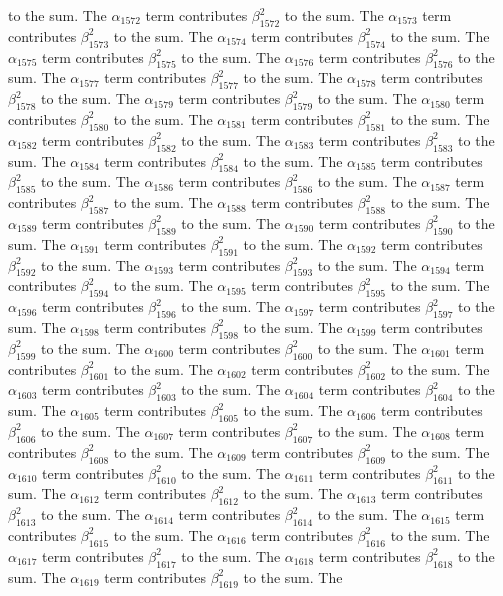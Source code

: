 \begin{lemma}
to the sum. The $\alpha_{1572}$ term contributes $\beta_{1572}^{2}$ to the sum. The $\alpha_{1573}$ term contributes $\beta_{1573}^{2}$ to the sum. The $\alpha_{1574}$ term contributes $\beta_{1574}^{2}$ to the sum. The $\alpha_{1575}$ term contributes $\beta_{1575}^{2}$ to the sum. The $\alpha_{1576}$ term contributes $\beta_{1576}^{2}$ to the sum. The $\alpha_{1577}$ term contributes $\beta_{1577}^{2}$ to the sum. The $\alpha_{1578}$ term contributes $\beta_{1578}^{2}$ to the sum. The $\alpha_{1579}$ term contributes $\beta_{1579}^{2}$ to the sum. The $\alpha_{1580}$ term contributes $\beta_{1580}^{2}$ to the sum. The $\alpha_{1581}$ term contributes $\beta_{1581}^{2}$ to the sum. The $\alpha_{1582}$ term contributes $\beta_{1582}^{2}$ to the sum. The $\alpha_{1583}$ term contributes $\beta_{1583}^{2}$ to the sum. The $\alpha_{1584}$ term contributes $\beta_{1584}^{2}$ to the sum. The $\alpha_{1585}$ term contributes $\beta_{1585}^{2}$ to the sum. The $\alpha_{1586}$ term contributes $\beta_{1586}^{2}$ to the sum. The $\alpha_{1587}$ term contributes $\beta_{1587}^{2}$ to the sum. The $\alpha_{1588}$ term contributes $\beta_{1588}^{2}$ to the sum. The $\alpha_{1589}$ term contributes $\beta_{1589}^{2}$ to the sum. The $\alpha_{1590}$ term contributes $\beta_{1590}^{2}$ to the sum. The $\alpha_{1591}$ term contributes $\beta_{1591}^{2}$ to the sum. The $\alpha_{1592}$ term contributes $\beta_{1592}^{2}$ to the sum. The $\alpha_{1593}$ term contributes $\beta_{1593}^{2}$ to the sum. The $\alpha_{1594}$ term contributes $\beta_{1594}^{2}$ to the sum. The $\alpha_{1595}$ term contributes $\beta_{1595}^{2}$ to the sum. The $\alpha_{1596}$ term contributes $\beta_{1596}^{2}$ to the sum. The $\alpha_{1597}$ term contributes $\beta_{1597}^{2}$ to the sum. The $\alpha_{1598}$ term contributes $\beta_{1598}^{2}$ to the sum. The $\alpha_{1599}$ term contributes $\beta_{1599}^{2}$ to the sum. The $\alpha_{1600}$ term contributes $\beta_{1600}^{2}$ to the sum. The $\alpha_{1601}$ term contributes $\beta_{1601}^{2}$ to the sum. The $\alpha_{1602}$ term contributes $\beta_{1602}^{2}$ to the sum. The $\alpha_{1603}$ term contributes $\beta_{1603}^{2}$ to the sum. The $\alpha_{1604}$ term contributes $\beta_{1604}^{2}$ to the sum. The $\alpha_{1605}$ term contributes $\beta_{1605}^{2}$ to the sum. The $\alpha_{1606}$ term contributes $\beta_{1606}^{2}$ to the sum. The $\alpha_{1607}$ term contributes $\beta_{1607}^{2}$ to the sum. The $\alpha_{1608}$ term contributes $\beta_{1608}^{2}$ to the sum. The $\alpha_{1609}$ term contributes $\beta_{1609}^{2}$ to the sum. The $\alpha_{1610}$ term contributes $\beta_{1610}^{2}$ to the sum. The $\alpha_{1611}$ term contributes $\beta_{1611}^{2}$ to the sum. The $\alpha_{1612}$ term contributes $\beta_{1612}^{2}$ to the sum. The $\alpha_{1613}$ term contributes $\beta_{1613}^{2}$ to the sum. The $\alpha_{1614}$ term contributes $\beta_{1614}^{2}$ to the sum. The $\alpha_{1615}$ term contributes $\beta_{1615}^{2}$ to the sum. The $\alpha_{1616}$ term contributes $\beta_{1616}^{2}$ to the sum. The $\alpha_{1617}$ term contributes $\beta_{1617}^{2}$ to the sum. The $\alpha_{1618}$ term contributes $\beta_{1618}^{2}$ to the sum. The $\alpha_{1619}$ term contributes $\beta_{1619}^{2}$ to the sum. The 
\end{lemma}
